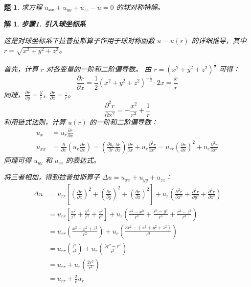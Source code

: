 \documentclass[12pt,a4paper]{article}
\newtheorem{problem}{题}
\newtheorem*{solution}{解}
\begin{document}
	\newpage
	\begin{problem}
		求方程 $u_{xx} + u_{yy} + u_{zz} - u = 0$ 的球对称特解。
	\end{problem}
		\hrulefill
	\begin{solution}
		\textbf{步骤1. 引入球坐标系}
		
		\noindent
	这是对球坐标系下拉普拉斯算子作用于球对称函数 $u=u(r)$ 的详细推导，其中 $r = \sqrt{x^2+y^2+z^2}$。
			
			首先，计算 $r$ 对各变量的一阶和二阶偏导数。
			由 $r = (x^2+y^2+z^2)^{\frac{1}{2}}$ 可得：
			\[
			\frac{\partial r}{\partial x} = \frac{1}{2}(x^2+y^2+z^2)^{-\frac{1}{2}} \cdot 2x = \frac{x}{r}
			\]
			同理，$\frac{\partial r}{\partial y} = \frac{y}{r}$，$\frac{\partial r}{\partial z} = \frac{z}{r}$。
			\[
			\frac{\partial^2 r}{\partial x^2} = - \frac{x^2}{r^3} + \frac{1}{r}
			\]
			利用链式法则，计算 $u(r)$ 的一阶和二阶偏导数：
			\begin{align*}
				u_x &= u_r \frac{\partial r}{\partial x} \\[6pt]
				u_{xx} &= \frac{\partial}{\partial x}\left(u_r \frac{\partial r}{\partial x}\right) = \left(\frac{\partial u_r}{\partial r}\frac{\partial r}{\partial x}\right)\frac{\partial r}{\partial x} + u_r \frac{\partial^2 r}{\partial x^2} = u_{rr}\left(\frac{\partial r}{\partial x}\right)^2 + u_r \frac{\partial^2 r}{\partial x^2}
			\end{align*}
			同理可得 $u_{yy}$ 和 $u_{zz}$ 的表达式。
			
			将三者相加，得到拉普拉斯算子 $\Delta u = u_{xx} + u_{yy} + u_{zz}$：
			\begin{align*}
				\Delta u &= u_{rr} \left[ \left(\frac{\partial r}{\partial x}\right)^2 + \left(\frac{\partial r}{\partial y}\right)^2 + \left(\frac{\partial r}{\partial z}\right)^2 \right] + u_r \left( \frac{\partial^2 r}{\partial x^2} + \frac{\partial^2 r}{\partial y^2} + \frac{\partial^2 r}{\partial z^2} \right) \\[6pt]
				&= u_{rr} \left[ \frac{x^2}{r^2} + \frac{y^2}{r^2} + \frac{z^2}{r^2} \right] + u_r \left( \frac{r^2-x^2}{r^3} + \frac{r^2-y^2}{r^3} + \frac{r^2-z^2}{r^3} \right) \\[6pt]
				&= u_{rr} \left( \frac{x^2+y^2+z^2}{r^2} \right) + u_r \left( \frac{3r^2 - (x^2+y^2+z^2)}{r^3} \right) \\[6pt]
				&= u_{rr} \left( \frac{r^2}{r^2} \right) + u_r \left( \frac{3r^2 - r^2}{r^3} \right) \\
				&= u_{rr} + u_r \left( \frac{2r^2}{r^3} \right) \\[6pt]
				&= u_{rr} + \frac{2}{r} u_r
			\end{align*}
			

\end{solution}
\end{document}
